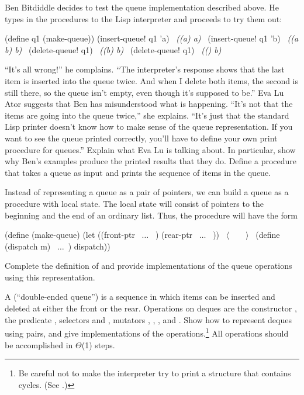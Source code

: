 \begin{exerciseGroup}
\label{Exercise 3.21}
 Ben Bitdiddle decides to test the
queue implementation described above.  He types in the procedures to the Lisp
interpreter and proceeds to try them out:

\begin{codeBlock}
(define q1 (make-queue))
(insert-queue! q1 'a)
~\textit{((a) a)}~
(insert-queue! q1 'b)
~\textit{((a b) b)}~
(delete-queue! q1)
~\textit{((b) b)}~
(delete-queue! q1)
~\textit{(() b)}~
\end{codeBlock}

``It's all wrong!'' he complains.  ``The interpreter's response shows that the
last item is inserted into the queue twice.  And when I delete both items, the
second  is still there, so the queue isn't empty, even though it's
supposed to be.''  Eva Lu Ator suggests that Ben has misunderstood what is
happening.  ``It's not that the items are going into the queue twice,'' she
explains.  ``It's just that the standard Lisp printer doesn't know how to make
sense of the queue representation.  If you want to see the queue printed
correctly, you'll have to define your own print procedure for queues.'' Explain
what Eva Lu is talking about.  In particular, show why Ben's examples produce
the printed results that they do.  Define a procedure  that
takes a queue as input and prints the sequence of items in the queue.

\label{Exercise 3.22}
 Instead of representing a queue
as a pair of pointers, we can build a queue as a procedure with local state.
The local state will consist of pointers to the beginning and the end of an
ordinary list.  Thus, the  procedure will have the form

\begin{codeBlock}
(define (make-queue)
  (let ((front-ptr ~\( \dots \)~ )
        (rear-ptr ~\( \dots \)~ ))
    ~\(\langle \)~~~~\(\rangle \)~
    (define (dispatch m) ~\( \dots \)~)
    dispatch))
\end{codeBlock}

Complete the definition of  and provide implementations of the
queue operations using this representation.

\label{Exercise 3.23}
 A  (``double-ended
queue'') is a sequence in which items can be inserted and deleted at either the
front or the rear.  Operations on deques are the constructor ,
the predicate , selectors  and
, mutators ,
, , and
.  Show how to represent deques using pairs, and give
implementations of the operations.\footnote{Be careful not to make the
interpreter try to print a structure that contains cycles.  (See .)}
All operations should be accomplished in \( \Theta \)(1) steps.
\end{exerciseGroup}

